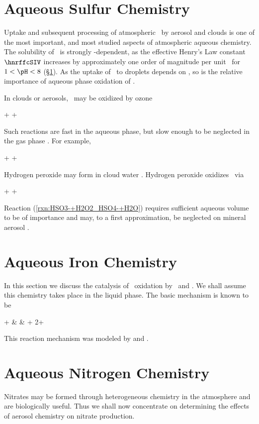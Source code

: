 \documentclass[12pt,twoside]{book}
\newcounter{reaction} %
\begin{document}
\section[Aqueous Sulfur Chemistry]{Aqueous Sulfur Chemistry}\label{sxn:chm_aqs_S}
Uptake and subsequent processing of atmospheric \SOd\ by aerosol
and clouds is one of the most important, and most studied aspects of
atmospheric aqueous chemistry.
The solubility of \SIV\ is strongly \pH-dependent, as the effective
Henry's Law constant $\hnrffcSIV$ increases by approximately one order
of magnitude per unit \pH\ for $1 < \pH < 8$ (\S\ref{sxn:chm_aqs_S}).
As the uptake of \SIV\ to droplets depends on \pH, so is the relative
importance of aqueous phase oxidation of \SIV.

In clouds or aerosols, \SOd\ may be oxidized by ozone 
\begin{reaction}
\SIV + \Ot \yields \SVI + \Od %
\end{reaction}
Such reactions are fast in the aqueous phase, but slow enough to be
neglected in the gas phase \cite[][p. 363]{SeP97}.
For example,
\begin{reaction}
\SOtdm + \Ot \yields \SOqdm + \Od %
\end{reaction}

Hydrogen peroxide may form in cloud water \cite{AFA94}.
Hydrogen peroxide oxidizes \SOd\ via
\begin{reaction}
\HSOtmaq + \HdOdaq \yields \HSOqmaq + \HdO %
\label{rxn:HSO3-+H2O2_HSO4-+H2O}
\end{reaction}
Reaction (\ref{rxn:HSO3-+H2O2_HSO4-+H2O}) requires sufficient aqueous
volume to be of importance and may, to a first approximation, be
neglected on mineral aerosol \cite[][]{DCZ96}. 

\section[Aqueous Iron Chemistry]{Aqueous Iron Chemistry}\label{sxn:chm_aqs_Fe}
In this section we discuss the catalysis of \SIV\ oxidation by
\FeIII\ and \MnII. 
We shall assume this chemistry takes place in the liquid phase.
The basic mechanism is known to be
\begin{rxnarray}
\label{rxn:SIV+O2_SVI} 
\HSOtm + \HdOd & \yields & \SOqdm + 2\Hp + \HdO %
\end{rxnarray}
This reaction mechanism was modeled by \cite{PaS89} and \cite{PSP92}.  

\section[Aqueous Nitrogen Chemistry]{Aqueous Nitrogen Chemistry}\label{sxn:chm_aqs_N}
Nitrates may be formed through heterogeneous chemistry in the
atmosphere and are biologically useful.
Thus we shall now concentrate on determining the effects of aerosol
chemistry on nitrate production.
\end{document}
